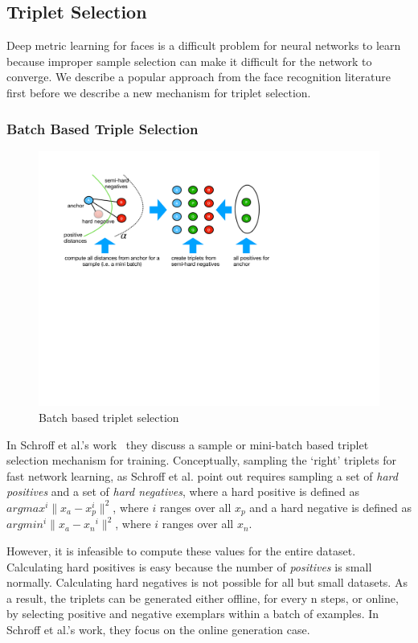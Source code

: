 \subsection{Triplet Selection}
Deep metric learning for faces is a difficult problem for neural networks to learn because improper sample selection can make it difficult for the network to converge.  We describe a popular approach from the face recognition literature first before we describe a new mechanism for triplet selection.

\subsubsection{Batch Based Triple Selection}
\begin{figure}
\includegraphics[width=1.0\linewidth]{triplet_selection}
\caption{Batch based triplet selection}
\label{triplet_selection}
\end{figure}

In Schroff et al.'s work~\cite{DBLP:conf/cvpr/SchroffKP15} they discuss a sample or mini-batch based triplet selection mechanism for training.  Conceptually, sampling the `right' triplets for fast network learning, as Schroff et al. point out requires sampling a set of \textit{hard positives} and a set of \textit{hard negatives}, where a hard positive is defined as $argmax^i \| x_{a} - x_{p}^i \|^2$, where $i$ ranges over all $x_p$ and a hard negative is defined as $argmin^i \| x_{a} - x{_n}^i \|^2$, where $i$ ranges over all $x_n$. 

However, it is infeasible to compute these values for the entire dataset.  Calculating hard positives is easy because the number of \textit{positives} is small normally.  Calculating hard negatives is not possible for all but small datasets.  As a result, the triplets can be generated either offline, for every n steps, or online, by selecting positive and negative exemplars within a batch of examples.  In Schroff et al.'s work, they focus on the online generation case.  

